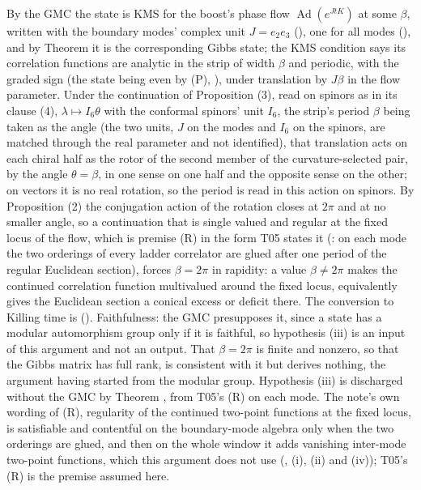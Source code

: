 By the GMC the state is KMS for the boost's phase flow $\operatorname{Ad}(e^{JtK})$ at some $\beta$, written with the boundary modes' complex unit $J = e_{2}e_{3}$ (), one for all modes (), and by Theorem  it is the corresponding Gibbs state; the KMS condition says its correlation functions are analytic in the strip of width $\beta$ and periodic, with the graded sign (the state being even by (P), ), under translation by $J\beta$ in the flow parameter. Under the continuation of Proposition (3), read on spinors as in its clause (4), $\lambda \mapsto I_{6}\theta$ with the conformal spinors' unit $I_{6}$, the strip's period $\beta$ being taken as the angle (the two units, $J$ on the modes and $I_{6}$ on the spinors, are matched through the real parameter and not identified), that translation acts on each chiral half as the rotor of the second member of the curvature-selected pair, by the angle $\theta = \beta$, in one sense on one half and the opposite sense on the other; on vectors it is no real rotation, so the period is read in this action on spinors. By Proposition (2) the conjugation action of the rotation closes at $2\pi$ and at no smaller angle, so a continuation that is single valued and regular at the fixed locus of the flow, which is premise (R) in the form T05 states it (: on each mode the two orderings of every ladder correlator are glued after one period of the regular Euclidean section), forces $\beta = 2\pi$ in rapidity: a value $\beta \neq 2\pi$ makes the continued correlation function multivalued around the fixed locus, equivalently gives the Euclidean section a conical excess or deficit there. The conversion to Killing time is \cite[Prop.~6.2]{ButlerT5} (). Faithfulness: the GMC presupposes it, since a state has a modular automorphism group only if it is faithful, so hypothesis (iii) is an input of this argument and not an output. That $\beta = 2\pi$ is finite and nonzero, so that the Gibbs matrix has full rank, is consistent with it but derives nothing, the argument having started from the modular group. Hypothesis (iii) is discharged without the GMC by Theorem , from T05's (R) on each mode. The note's own wording of (R), regularity of the continued two-point functions at the fixed locus, is satisfiable and contentful on the boundary-mode algebra only when the two orderings are glued, and then on the whole window it adds vanishing inter-mode two-point functions, which this argument does not use (, (i), (ii) and (iv)); T05's (R) is the premise assumed here.
